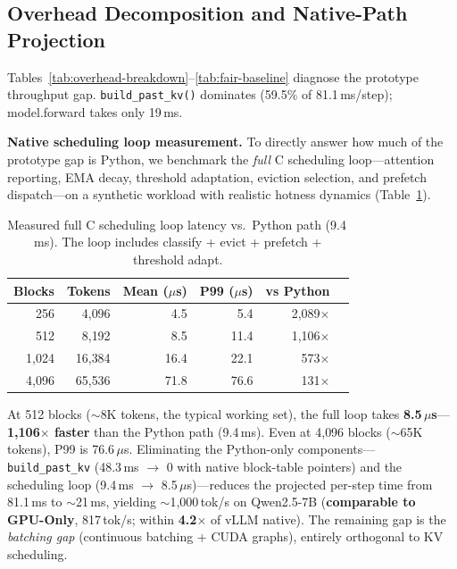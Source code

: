 \documentclass[conference]{IEEEtran}
\begin{document}
\subsection{Overhead Decomposition and Native-Path Projection}
\label{sec:overhead}

Tables~\ref{tab:overhead-breakdown}--\ref{tab:fair-baseline} diagnose the prototype throughput gap. \texttt{build\_past\_kv()} dominates (59.5\% of 81.1\,ms/step); model.forward takes only 19\,ms.

\textbf{Native scheduling loop measurement.} To directly answer how much of the prototype gap is Python, we benchmark the \emph{full} C scheduling loop---attention reporting, EMA decay, threshold adaptation, eviction selection, and prefetch dispatch---on a synthetic workload with realistic hotness dynamics (Table~\ref{tab:native-loop}).

\begin{table}[t]
\centering
\caption{Measured full C scheduling loop latency vs.\ Python path (9.4\,ms). The loop includes classify + evict + prefetch + threshold adapt.}
\label{tab:native-loop}
\small
\setlength{\tabcolsep}{5pt}
\begin{tabular}{@{}rrrrrr@{}}
\toprule
Blocks & Tokens & Mean ($\mu$s) & P99 ($\mu$s) & vs Python \\
\midrule
256  & 4{,}096  & 4.5  & 5.4  & 2{,}089$\times$ \\
512  & 8{,}192  & 8.5  & 11.4 & 1{,}106$\times$ \\
1{,}024 & 16{,}384 & 16.4 & 22.1 & 573$\times$ \\
4{,}096 & 65{,}536 & 71.8 & 76.6 & 131$\times$ \\
\bottomrule
\end{tabular}
\end{table}

At 512 blocks (${\sim}$8K tokens, the typical working set), the full loop takes \textbf{8.5\,$\mu$s}---\textbf{1{,}106$\times$ faster} than the Python path (9.4\,ms). Even at 4{,}096 blocks (${\sim}$65K tokens), P99 is 76.6\,$\mu$s. Eliminating the Python-only components---\texttt{build\_past\_kv} (48.3\,ms $\to$ 0 with native block-table pointers) and the scheduling loop (9.4\,ms $\to$ 8.5\,$\mu$s)---reduces the projected per-step time from 81.1\,ms to ${\sim}$21\,ms, yielding ${\sim}$1{,}000\,tok/s on Qwen2.5-7B (\textbf{comparable to GPU-Only}, 817\,tok/s; within \textbf{4.2$\times$} of vLLM native). The remaining gap is the \emph{batching gap} (continuous batching + CUDA graphs), entirely orthogonal to KV scheduling.
\end{document}
